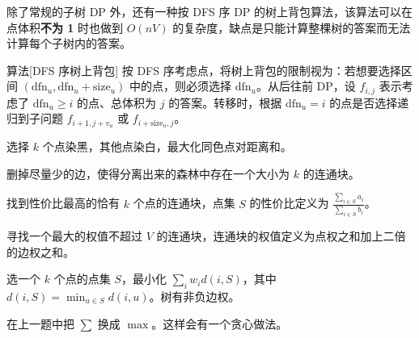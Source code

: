 除了常规的子树 DP 外，还有一种按 DFS 序 DP 的树上背包算法，该算法可以在点体积\textbf{不为 1} 时也做到 $O(nV)$ 的复杂度，缺点是只能计算整棵树的答案而无法计算每个子树内的答案。
\begin{descbox}{算法}[DFS 序树上背包]
    按 DFS 序考虑点，将树上背包的限制视为：若想要选择区间 $(\mathrm{dfn}_u,\mathrm{dfn}_u+\mathrm{size}_u)$ 中的点，则必须选择 $\mathrm{dfn}_u$。从后往前 DP，设 $f_{i,j}$ 表示考虑了 $\mathrm{dfn}_u\ge i$ 的点、总体积为 $j$ 的答案。转移时，根据 $\mathrm{dfn}_u=i$ 的点是否选择递归到子问题 $f_{i+1,j+v_u}$ 或 $f_{i+\mathrm{size}_u,j}$。
\end{descbox}

\begin{example}[{[HAOI2015] 树上染色}]
    选择 $k$ 个点染黑，其他点染白，最大化同色点对距离和。
\end{example}

\begin{example}
    删掉尽量少的边，使得分离出来的森林中存在一个大小为 $k$ 的连通块。
\end{example}

\begin{exercise}[{[JSOI2016] 最佳团体}]
    找到性价比最高的恰有 $k$ 个点的连通块，点集 $S$ 的性价比定义为 $\frac{\sum_{i\in S} a_i}{\sum_{i\in S} b_i}$。
\end{exercise}

\begin{exercise}[P1270 “访问”美术馆]
    寻找一个最大的权值不超过 $V$ 的连通块，连通块的权值定义为点权之和加上二倍的边权之和。
\end{exercise}

\begin{exercise}[{[JSOI2018] 潜入行动}]
    
\end{exercise}

\begin{example}[{[IOI 2005] Riv 河流}]
    
\end{example}
\begin{exercise}
   选一个 $k$ 个点的点集 $S$，最小化 $\sum_i w_i d(i,S)$，其中 $d(i,S)=\min_{u\in S}d(i,u)$。树有非负边权。
\end{exercise}
\begin{exercise}
    在上一题中把 $\sum$ 换成 $\max$。这样会有一个贪心做法。
\end{exercise}

